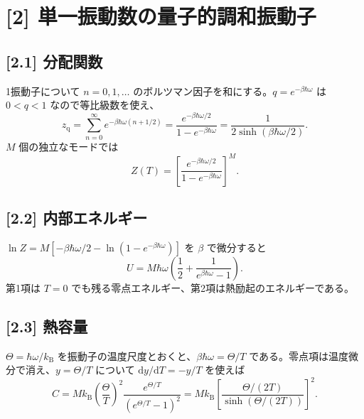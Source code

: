 \documentclass[11pt,a4paper]{article}
\begin{document}
\section*{[2] 単一振動数の量子的調和振動子}
\subsection*{[2.1] 分配関数}
1振動子について $n=0,1,\ldots$ のボルツマン因子を和にする。$q=e^{-\beta\hbar\omega}$ は $0<q<1$ なので等比級数を使え、
\begin{equation}
z_{\mathrm q}=\sum_{n=0}^{\infty}
 e^{-\beta\hbar\omega(n+1/2)}
 =\frac{e^{-\beta\hbar\omega/2}}{1-e^{-\beta\hbar\omega}}
 =\frac{1}{2\sinh(\beta\hbar\omega/2)}.
\end{equation}
$M$ 個の独立なモードでは
\begin{equation}
\boxed{Z(T)=\left[
\frac{e^{-\beta\hbar\omega/2}}{1-e^{-\beta\hbar\omega}}
\right]^M}.
\end{equation}

\subsection*{[2.2] 内部エネルギー}
$\ln Z=M[-\beta\hbar\omega/2-\ln(1-e^{-\beta\hbar\omega})]$ を $\beta$ で微分すると
\begin{equation}
\boxed{U=M\hbar\omega\left(
\frac12+\frac{1}{e^{\beta\hbar\omega}-1}
\right)}.
\end{equation}
第1項は $T=0$ でも残る零点エネルギー、第2項は熱励起のエネルギーである。

\subsection*{[2.3] 熱容量}
$\Theta=\hbar\omega/k_{\mathrm B}$ を振動子の温度尺度とおくと、$\beta\hbar\omega=\Theta/T$ である。零点項は温度微分で消え、$y=\Theta/T$ について $\mathrm dy/\mathrm dT=-y/T$ を使えば
\begin{equation}
\boxed{C=Mk_{\mathrm B}
\left(\frac{\Theta}{T}\right)^2
\frac{e^{\Theta/T}}{(e^{\Theta/T}-1)^2}}
=Mk_{\mathrm B}\left[
\frac{\Theta/(2T)}{\sinh(\Theta/(2T))}
\right]^2.
\end{equation}
\end{document}
